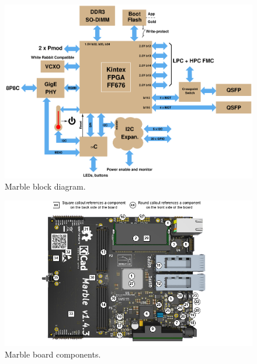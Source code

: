 \documentclass[12pt,oneside,a4]{article}
\begin{document}
\begin{figure}[H]
\begin{center}
\includegraphics[width=1\linewidth]{block_k3.png}
 \caption{Marble block diagram.}\label{fig:block}
\end{center}
\end{figure}

\begin{figure}[H]
\begin{center}
\includegraphics[width=1\linewidth]{marble_references.png}
 \caption{Marble board components.}\label{fig:components}
\end{center}
\end{figure}
\end{document}

